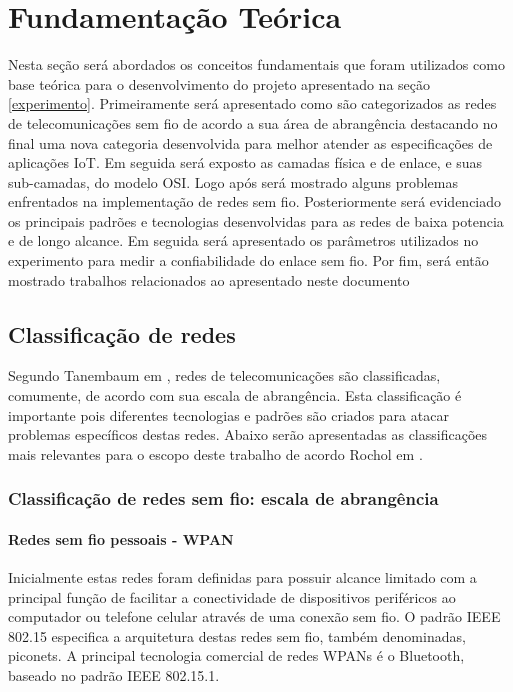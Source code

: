 \chapter{Fundamentação Teórica}
\label{fundamentacao}
Nesta seção será abordados os conceitos fundamentais que foram utilizados como base teórica para o desenvolvimento do projeto apresentado na seção \ref{experimento}.
Primeiramente será apresentado como são categorizados as redes de telecomunicações sem fio de acordo a sua área de abrangência destacando no final uma nova categoria desenvolvida para melhor atender as especificações de aplicações IoT.
Em seguida será exposto as camadas física e de enlace, e suas sub-camadas, do modelo OSI.
Logo após será mostrado alguns problemas enfrentados na implementação de redes sem fio.
Posteriormente será evidenciado os principais padrões e tecnologias desenvolvidas para as redes de baixa potencia e de longo alcance.
Em seguida será apresentado os parâmetros utilizados no experimento para medir a confiabilidade do enlace sem fio.
Por fim, será então mostrado trabalhos relacionados ao apresentado neste documento

\section{Classificação de redes}
\label{classRedes}
Segundo Tanembaum em \cite{tanembaum2011}, redes de telecomunicações são classificadas, comumente, de acordo com sua escala de abrangência. Esta classificação é importante pois diferentes tecnologias e padrões são criados para atacar problemas específicos destas redes. Abaixo serão apresentadas as classificações mais relevantes para o escopo deste trabalho de acordo Rochol em \cite{rochol2018sistemas}.


\subsection{Classificação de redes sem fio: escala de abrangência}
\subsubsection*{Redes sem fio pessoais - WPAN}
Inicialmente estas redes foram definidas para possuir alcance limitado com a principal função de facilitar a conectividade de dispositivos periféricos ao computador ou telefone celular através de uma conexão sem fio. O padrão IEEE 802.15 especifica a arquitetura destas redes sem fio, também denominadas, piconets. A principal  tecnologia comercial de redes WPANs é o Bluetooth, baseado no padrão IEEE 802.15.1.

